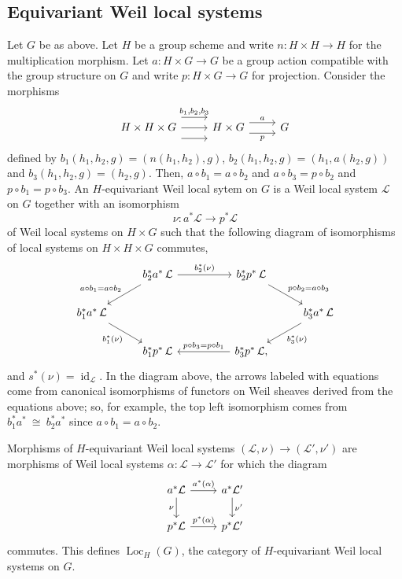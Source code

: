 \documentclass[10pt]{amsart}
\theoremstyle{plain}
\theoremstyle{definition}
\DeclareMathOperator{\id}{id}
\DeclareMathOperator{\Loc}{Loc}
\newcommand{\iso}{{\ \cong\ }}
\newcommand{\cs}[1]{{\mathcal{#1}}}
\begin{document}
\subsection{Equivariant Weil local systems}

Let $G$ be as above.
Let $H$ be a group scheme and write $n : H \times H \to H$ for the multiplication morphism.
Let $a : H \times G\to G$ be a group action compatible with the group structure on $G$ and write $p : H\times G \to G$ for projection. 
Consider the morphisms
\[
\begin{tikzcd}
H \times H \times G 
\arrow[shift left=4]{r}{b_1, b_2, b_3} 
\arrow{r}{}
\arrow[shift right=4]{r}{} 
& H \times G 
\arrow[shift left=2]{r}{a}
\arrow[shift right=2]{r}[swap]{p}
 & G 
\end{tikzcd}
\]
defined by $b_1(h_1,h_2,g) = (n(h_1,h_2),g)$,  $b_2(h_1,h_2,g) = (h_1,a(h_2,g))$ and $b_3(h_1,h_2,g) = (h_2,g)$.
Then, $a\circ b_1 = a\circ b_2$ and $a\circ b_3 = p\circ b_2$ and $p\circ b_1 = p\circ b_3$.
An $H$-equivariant Weil local sytem on $G$ is a Weil local system $\cs{L}$ on $G$ together with an isomorphism  
\[
\nu : a^*\cs{L} \to p^*\cs{L}
\] 
of Weil local systems on $H\times G$ such that the following diagram of isomorphisms of local systems on $H\times H\times G$ commutes,
\[
\begin{tikzcd}
\ &  \arrow{dl}[swap]{a\circ b_1 = a\circ b_2}  b_2^*  a^*\, \mathcal{L} \arrow{rr}{b_2^*(\nu)} && b_2^* p^*\, \mathcal{L} \arrow{dr}{p\circ b_2 = a\circ b_3} & \\
b_1^* a^*\, \mathcal{L} \arrow{dr}[swap]{b_1^*(\nu)} &&&&   \arrow{dl}{b_3^*(\nu)} b_3^* a^*\, \mathcal{L} \\
& b_1^* p^*\, \mathcal{L}  && \arrow{ll}[swap]{p\circ b_3 = p\circ b_1} b_3^* p^*\, \mathcal{L}, & 
\end{tikzcd}
\]
and $s^*(\nu) = \id_{\cs{L}}$.
In the diagram above, the arrows labeled with equations come from canonical isomorphisms of functors on Weil sheaves derived from the equations above; so, for example, the top left isomorphism comes from $b_1^* a^* \iso b_2^* a^*$ since $a\circ b_1 = a\circ b_2$.
\iffalse
On stalks, this condition is ...
\[
\begin{tikzcd}
\ &  \cs{L}_{h_1\cdot(h_2\cdot g)} \arrow{r}{\nu_{h_1,h_2\cdot g}} & \cs{L}_{h_2\cdot g} & \\
\cs{L}_{(h_1 h_2) \cdot g} \arrow{dr}[swap]{\nu_{(h_1h_2),g}} \arrow[equal]{ur} &&& \arrow[equal]{ul}  \arrow{dl}{\nu_{h_2,g}} \cs{L}_{h_2\cdot g} \\
& \cs{L}_g \arrow[equal]{r} & \cs{L}_g & 
\end{tikzcd}
\]
\fi
Morphisms of $H$-equivariant Weil local systems $(\cs{L},\nu)\to (\cs{L}',\nu')$ are morphisms of Weil local systems $\alpha: \cs{L}\to \cs{L}'$ for which the diagram
\[
\begin{tikzcd}
\arrow{d}[swap]{\nu} a^*\cs{L} \arrow{r}{a^*(\alpha)} & a^*\cs{L}' \arrow{d}{\nu'} \\
p^*\cs{L} \arrow{r}{p^*(\alpha)} & p^*\cs{L}'
\end{tikzcd}
\]
commutes.
This defines $\Loc_H(G)$, the category of $H$-equivariant Weil local systems on $G$.
\end{document}
